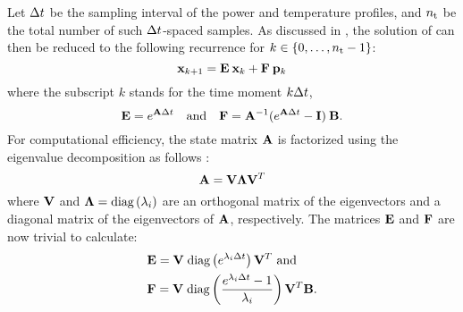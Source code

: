 Let $\Delta t$ be the sampling interval of the power and temperature profiles, and ${n_\text{t}}$ be the total number of such $\Delta t$-spaced samples. As discussed in \cite{ukhov2012}, the solution of  can then be reduced to the following recurrence for $k \in \{ 0, \dots, {n_\text{t}} - 1 \}$:
\begin{equation} \elabel{recurrence}
  \vX_{k + 1} = \mE \: \vX_k + \mF \: \vP_k
\end{equation}
where the subscript $k$ stands for the time moment $k \Delta t$,
\[
  \mathbf{E} = e^{\mathbf{A} \Delta t} \hspace{1em} \text{and} \hspace{1em} \mathbf{F} = \mathbf{A}^{-1} (e^{\mathbf{A} \Delta t} - \mathbf{I}) \: \mathbf{B}.
\]
For computational efficiency, the state matrix $\mathbf{A}$ is factorized using the eigenvalue decomposition as follows \cite{press2007}:
\begin{equation} \elabel{eigenvalue-decomposition}
  \mA = \mV \mL \mV^T
\end{equation}
where $\mathbf{V}$ and $\mathbf{\Lambda} = \text{diag}\left( \lambda_i \right)$ are an orthogonal matrix of the eigenvectors and a diagonal matrix of the eigenvectors of $\mathbf{A}$, respectively.
The matrices $\mathbf{E}$ and $\mathbf{F}$ are now trivial to calculate:
\begin{align*}
  & \mathbf{E} = \mathbf{V} \; \text{diag}\left( e^{\lambda_i \Delta t} \right) \mathbf{V}^T \text{ and} \\
  & \mathbf{F} = \mathbf{V} \; \text{diag}\left(  \frac{e^{\lambda_i \Delta t} - 1}{\lambda_i}  \right) \mathbf{V}^T \mathbf{B}.
\end{align*}
